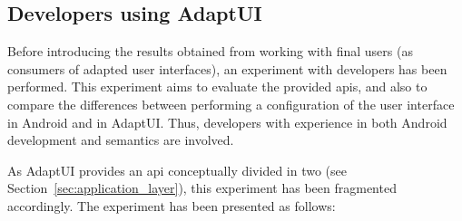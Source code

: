 \subsection{Developers using AdaptUI}
\label{sec:developers}

Before introducing the results obtained from working with final users (as 
consumers of adapted user interfaces), an experiment with developers has been 
performed. This experiment aims to evaluate the provided \acp{api}, and also to 
compare the differences between performing a configuration of the user interface 
in Android and in AdaptUI. Thus, developers with experience in both Android
development and semantics are involved.

As AdaptUI provides an \ac{api} conceptually divided in two (see 
Section~\ref{sec:application_layer}), this experiment has been fragmented 
accordingly. The experiment has been presented as follows:

